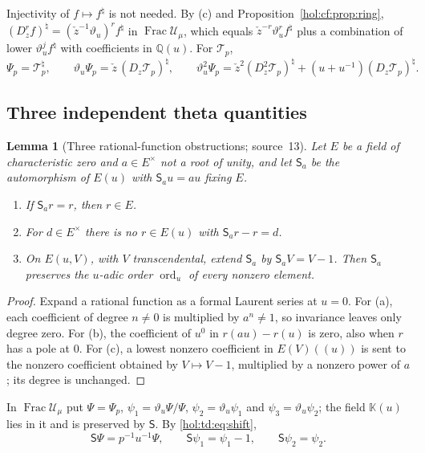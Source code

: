 \documentclass[11pt]{article}
\numberwithin{equation}{section}
\newtheorem{lemma}[theorem]{Lemma}
\theoremstyle{definition}
\theoremstyle{remark}
\newcommand{\Q}{\mathbb Q}
\newcommand{\KK}{\mathbb K}
\begin{document}
Injectivity of $f\mapsto f^\natural$ is not needed. By (c) and
Proposition~\ref{hol:cf:prop:ring}, $(D_z^rf)^\natural=(\check
z^{-1}\vartheta_u)^rf^\natural$ in $\operatorname{Frac}\mathcal U_\mu$, which
equals $\check z^{-r}\vartheta_u^rf^\natural$ plus a combination of lower
$\vartheta_u^jf^\natural$ with coefficients in $\Q(u)$. For $\mathcal T_p$,
\begin{equation}\label{hol:td:eq:jets}
 \Psi_p=\mathcal T_p^\natural,\qquad
 \vartheta_u\Psi_p=\check z\,(D_z\mathcal T_p)^\natural,\qquad
 \vartheta_u^2\Psi_p=\check z^2(D_z^2\mathcal T_p)^\natural
 +(u+u^{-1})(D_z\mathcal T_p)^\natural .
\end{equation}

\subsection{Three independent theta quantities}\label{hol:td:sub:independent}

\begin{lemma}[Three rational-function obstructions; source~13]
\label{hol:td:lem:rational}
Let $E$ be a field of characteristic zero and $a\in E^\times$ not a root of
unity, and let $\mathsf S_a$ be the automorphism of $E(u)$ with
$\mathsf S_au=au$ fixing $E$.
\begin{enumerate}[label=\textup{(\alph*)}]
\item If $\mathsf S_ar=r$, then $r\in E$.
\item For $d\in E^\times$ there is no $r\in E(u)$ with $\mathsf S_ar-r=d$.
\item On $E(u,V)$, with $V$ transcendental, extend $\mathsf S_a$ by
$\mathsf S_aV=V-1$. Then $\mathsf S_a$ preserves the $u$-adic order
$\operatorname{ord}_u$ of every nonzero element.
\end{enumerate}
\end{lemma}

\begin{proof}
Expand a rational function as a formal Laurent series at $u=0$. For (a), each
coefficient of degree $n\ne0$ is multiplied by $a^n\ne1$, so invariance leaves
only degree zero. For (b), the coefficient of $u^0$ in $r(au)-r(u)$ is zero,
also when $r$ has a pole at $0$. For (c), a lowest nonzero coefficient in
$E(V)((u))$ is sent to the nonzero coefficient obtained by $V\mapsto V-1$,
multiplied by a nonzero power of $a$; its degree is unchanged.
\end{proof}

In $\operatorname{Frac}\mathcal U_\mu$ put $\Psi=\Psi_p$,
$\psi_1=\vartheta_u\Psi/\Psi$, $\psi_2=\vartheta_u\psi_1$ and
$\psi_3=\vartheta_u\psi_2$; the field $\KK(u)$ lies in it and is preserved by
$\mathsf S$. By \eqref{hol:td:eq:shift},
\begin{equation}\label{hol:td:eq:sigmajets}
 \mathsf S\Psi=p^{-1}u^{-1}\Psi,\qquad
 \mathsf S\psi_1=\psi_1-1,\qquad
 \mathsf S\psi_2=\psi_2 .
\end{equation}
\end{document}
